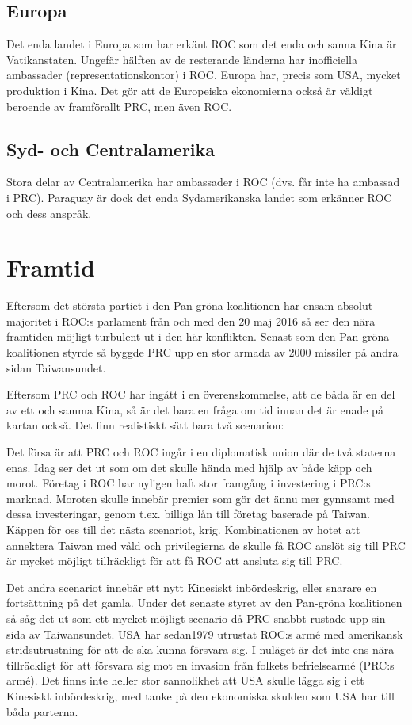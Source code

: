 \documentclass[a4paper,10pt]{article}
\begin{document}
\subsection*{Europa}
Det enda landet i Europa som har erkänt ROC som det enda och sanna Kina är Vatikanstaten. Ungefär hälften av de resterande länderna har inofficiella ambassader (representationskontor) i ROC. Europa har, precis som USA, mycket produktion i Kina. Det gör att de Europeiska ekonomierna också är väldigt beroende av framförallt PRC, men även ROC. 

\subsection*{Syd- och Centralamerika}
Stora delar av Centralamerika har ambassader i ROC (dvs. får inte ha ambassad i PRC). Paraguay är dock det enda Sydamerikanska landet som erkänner ROC och dess anspråk.

\section*{Framtid}
Eftersom det största partiet i den Pan-gröna koalitionen har ensam absolut majoritet i ROC:s parlament från och med den 20 maj 2016 så ser den nära framtiden möjligt turbulent ut i den här konflikten. Senast som den Pan-gröna koalitionen styrde så byggde PRC upp en stor armada av 2000 missiler på andra sidan Taiwansundet.

Eftersom PRC och ROC har ingått i en överenskommelse, att de båda är en del av ett och samma Kina, så är det bara en fråga om tid innan det är enade på kartan också. Det finn realistiskt sätt bara två scenarion:

Det försa är att PRC och ROC ingår i en diplomatisk union där de två staterna enas. Idag ser det ut som om det skulle hända med hjälp av både käpp och morot. Företag i ROC har nyligen haft stor framgång i investering i PRC:s marknad. Moroten skulle innebär premier som gör det ännu mer gynnsamt med dessa investeringar, genom t.ex. billiga lån till företag baserade på Taiwan. Käppen för oss till det nästa scenariot, krig. Kombinationen av hotet att annektera Taiwan med våld och privilegierna de skulle få ROC anslöt sig till PRC är mycket möjligt tillräckligt för att få ROC att ansluta sig till PRC.

Det andra scenariot innebär ett nytt Kinesiskt inbördeskrig, eller snarare en fortsättning på det gamla. Under det senaste styret av den Pan-gröna koalitionen så såg det ut som ett mycket möjligt scenario då PRC snabbt rustade upp sin sida av Taiwansundet. USA har sedan1979 utrustat ROC:s armé med amerikansk stridsutrustning för att de ska kunna försvara sig. I nuläget är det inte ens nära tillräckligt för att försvara sig mot en invasion från folkets befrielsearmé (PRC:s armé). Det finns inte heller stor sannolikhet att USA skulle lägga sig i ett Kinesiskt inbördeskrig, med tanke på den ekonomiska skulden som USA har till båda parterna.
\end{document}
